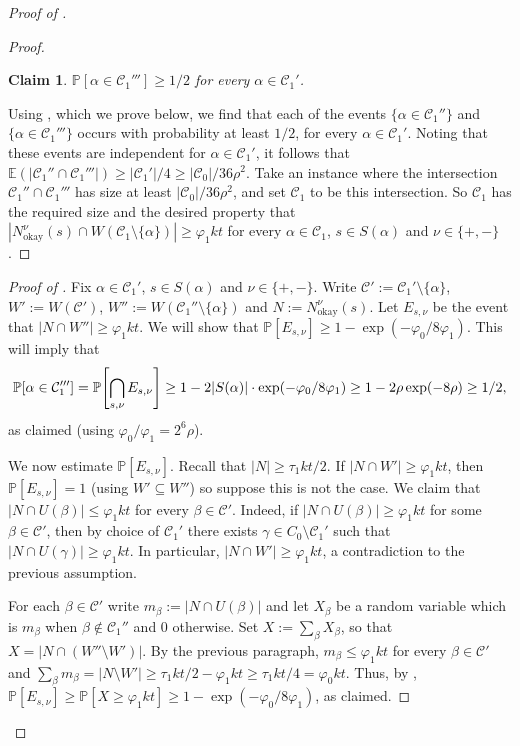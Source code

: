 \documentclass[english]{article}
\theoremstyle{plain}
\newtheorem{claim}[theorem]{Claim}
\theoremstyle{remark}
\def\C{\mathcal{C}}
\def\Ex{\mathbb{E}}
\let\phi\varphi
\def \Nnuo{N^{\nu}_{\okay}}
\renewcommand{\Pr}{\mathbb{P}}
\let\originalleft\left
\let\originalright\right
\renewcommand{\left}{\mathopen{}\mathclose\bgroup\originalleft}
\renewcommand{\right}{\aftergroup\egroup\originalright}
\DeclareMathOperator{\okay}{okay}
\begin{document}
\begin{proof}[Proof of ]
\begin{proof}
				\begin{claim} \label{claim:available-two}
					$\Pr[\alpha \in \C_1'''] \ge 1/2$ for every $\alpha \in \C_1'$.
				\end{claim}

				Using , which we prove below, we find that each of the events $\{\alpha \in \C_1''\}$ and $\{\alpha \in \C_1'''\}$ occurs with probability at least $1/2$, for every $\alpha \in \C_1'$. Noting that these events are independent for $\alpha \in \C_1'$, it follows that $\Ex(|\C_1'' \cap \C_1'''|) \ge |\C_1'|/4 \ge |\C_0|/36\rho^2$. Take an instance where the intersection $\C_1'' \cap \C_1'''$ has size at least $|\C_0|/36\rho^2$, and set $\C_1$ to be this intersection. So $\C_1$ has the required size and the desired property that $|\Nnuo(s) \cap W(\C_1 \setminus \{\alpha\})| \ge \phi_1 kt$ for every $\alpha \in \C_1$, $s \in S(\alpha)$ and $\nu \in \{+, -\}$.
			\end{proof}

			\begin{proof}[Proof of ]
				Fix $\alpha \in \C_1'$, $s \in S(\alpha)$ and $\nu \in \{+, -\}$. Write $\C' := \C_1' \setminus \{\alpha\}$, $W' := W(\C')$, $W'' := W(\C_1'' \setminus \{\alpha\})$ and $N := \Nnuo(s)$.
				Let $E_{s, \nu}$ be the event that $|N \cap W''| \ge \phi_1 kt$. We will show that $\Pr[E_{s, \nu}] \ge 1 - \exp(-\phi_0 / 8\phi_1)$. This will imply that 
				\begin{equation*}
					\Pr[\alpha \in \C_1'''] 
					= \Pr\left[\bigcap_{s, \nu} E_{s, \nu}\right] 
					\ge 1 - 2|S(\alpha)| \cdot \exp(-\phi_0 / 8 \phi_1) 
					\ge 1 - 2\rho \exp(-8\rho) 
					\ge 1/2, 
				\end{equation*}
				as claimed (using $\phi_0 / \phi_1 = 2^6\rho$).

				We now estimate $\Pr[E_{s, \nu}]$.
				Recall that $|N| \ge \tau_1 kt / 2$. If $|N \cap W'| \ge \phi_1 kt$, then $\Pr[E_{s, \nu}] = 1$ (using $W' \subseteq W''$) so suppose this is not the case. 
				We claim that $|N \cap U(\beta)| \le \phi_1 kt$ for every $\beta \in \C'$.
				Indeed, if $|N \cap U(\beta)| \ge \phi_1 kt$ for some $\beta \in \C'$, then by choice of $\C_1'$ there exists $\gamma \in C_0 \setminus \C_1'$ such that $|N \cap U(\gamma)| \ge \phi_1 kt$. In particular, $|N \cap W'| \ge \phi_1 kt$, a contradiction to the previous assumption. 

				For each $\beta \in \C'$ write $m_{\beta} := |N \cap U(\beta)|$ and let $X_{\beta}$ be a random variable which is $m_{\beta}$ when $\beta \notin \C_1''$ and $0$ otherwise. Set $X := \sum_{\beta} X_{\beta}$, so that $X = |N \cap (W'' \setminus W')|$. By the previous paragraph, $m_{\beta} \le \phi_1 kt$ for every $\beta \in \C'$ and $\sum_{\beta} m_{\beta} = |N \setminus W'| \ge \tau_1 kt/2 - \phi_1 kt \ge \tau_1 kt / 4 = \phi_0 kt$.
				Thus, by , $\Pr[E_{s, \nu}] \ge \Pr[X \ge \phi_1 kt] \ge 1 - \exp(-\phi_0 / 8\phi_1)$, as claimed.
			\end{proof}
			


\end{proof}
\end{document}
